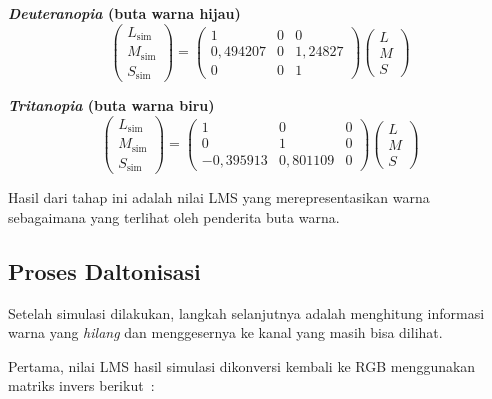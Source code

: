 \noindent\textbf{\textit{Deuteranopia} (buta warna hijau)}
\begin{equation}
  \begin{pmatrix} L_{\text{sim}} \\ M_{\text{sim}} \\ S_{\text{sim}} \end{pmatrix}
  =
  \begin{pmatrix}
    1         & 0 & 0 \\
    0{,}494207 & 0 & 1{,}24827 \\
    0         & 0 & 1
  \end{pmatrix}
  \begin{pmatrix} L \\ M \\ S \end{pmatrix}
  \label{eq:sim-deuteranopia}
\end{equation}

\noindent\textbf{\textit{Tritanopia} (buta warna biru)}
\begin{equation}
  \begin{pmatrix} L_{\text{sim}} \\ M_{\text{sim}} \\ S_{\text{sim}} \end{pmatrix}
  =
  \begin{pmatrix}
    1          & 0         & 0 \\
    0          & 1         & 0 \\
    -0{,}395913 & 0{,}801109 & 0
  \end{pmatrix}
  \begin{pmatrix} L \\ M \\ S \end{pmatrix}
  \label{eq:sim-tritanopia}
\end{equation}

Hasil dari tahap ini adalah nilai LMS yang merepresentasikan warna sebagaimana yang terlihat oleh penderita buta warna.

\subsection{Proses Daltonisasi}

Setelah simulasi dilakukan, langkah selanjutnya adalah menghitung informasi warna yang \textit{hilang} dan menggesernya ke kanal yang masih bisa dilihat.

Pertama, nilai LMS hasil simulasi dikonversi kembali ke RGB menggunakan matriks invers berikut~\parencite{Vienot1999DigitalVC, muhammad2020analysis, tasnim2017}:

